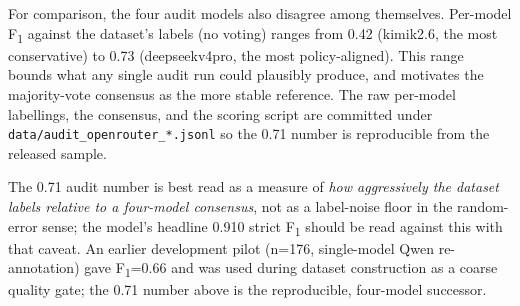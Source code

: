 \documentclass[sigconf,nonacm]{acmart}
\newcommand*{\Bhy}{\discretionary{-}{}{-}}%
\begin{document}
For comparison, the four audit models also disagree among themselves.
Per-model F\textsubscript{1} against the dataset's labels (no
voting) ranges from 0.42 (\textsf{kimi\Bhy k2.6}, the most
conservative) to 0.73 (\textsf{deepseek\Bhy v4\Bhy pro}, the most
policy-aligned). This range bounds what any single audit run
could plausibly produce, and motivates the majority-vote consensus
as the more stable reference. The raw per-model labellings, the
consensus, and the scoring script are committed under
\texttt{data/audit\_openrouter\_*.jsonl} so the 0.71 number is
reproducible from the released sample.

The 0.71 audit number is best read as a measure of \emph{how
aggressively the dataset labels relative to a four-model
consensus}, not as a label-noise floor in the random-error sense;
the model's headline 0.910 strict F\textsubscript{1} should be read
against this with that caveat. An earlier development pilot
(n=176, single-model Qwen re-annotation) gave F\textsubscript{1}=0.66
and was used during dataset construction as a coarse quality gate;
the 0.71 number above is the reproducible, four-model successor.
\end{document}
